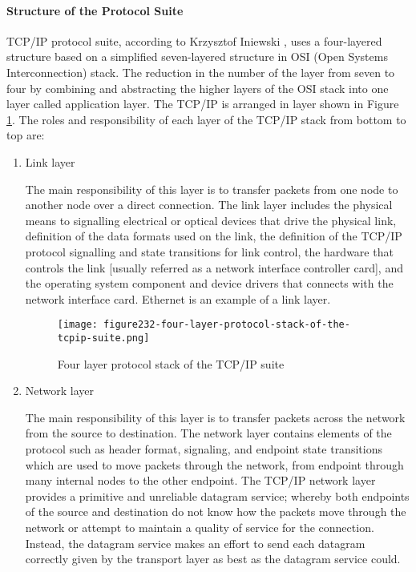 \paragraph{Structure of the Protocol Suite}
TCP/IP protocol suite, according to Krzysztof Iniewski \cite{KrzyzstofBook}, uses a four-layered structure based on a simplified seven-layered structure in OSI (Open Systems Interconnection) stack. The reduction in the number of the layer from seven to four by combining and abstracting the higher layers of the OSI stack into one layer called application layer. The TCP/IP is arranged in layer shown in Figure \ref{fig:fig232}. The roles and responsibility of each layer of the TCP/IP stack from bottom to top are: 
\begin{enumerate}
\itemsep0em
\item Link layer

The main responsibility of this layer is to transfer packets from one node to another node over a direct connection. The link layer includes the physical means to signalling electrical or optical devices that drive the physical link,  definition of the data formats used on the link, the definition of the TCP/IP protocol signalling and state transitions for link control, the hardware that controls the link [usually referred as a network interface controller card], and the operating system component and device drivers that connects with the network interface card. Ethernet is an example of a link layer.

\begin{figure}[h]
\centering
\texttt{[image: figure232-four-layer-protocol-stack-of-the-tcpip-suite.png]}
\caption{Four layer protocol stack of the TCP/IP suite \protect\cite{KrzyzstofBook}}
\label{fig:fig232}
\end{figure}

\item Network layer

The main responsibility of this layer is to transfer packets across the network from the source to destination. The network layer contains elements of the protocol such as header format, signaling, and endpoint state transitions which are used to move packets through the network, from endpoint through many internal nodes to the other endpoint. The TCP/IP network layer provides a primitive and unreliable datagram service; whereby both endpoints of the source and destination do not know how the packets move through the network or attempt to maintain a quality of service for the connection. Instead, the datagram service makes an effort to send each datagram correctly given by the transport layer as best as the datagram service could. 


\end{enumerate}
